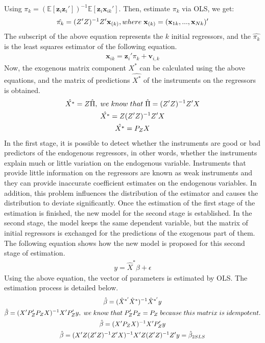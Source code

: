 \documentclass{article}
\newcommand\tab[1][0.5cm]{\hspace*{#1}}
\begin{document}
\newline
Using $\pi_{k} = (\mathbb{E}[\textbf{z}_{i} \textbf{z}_{i}'])^{-1} \mathbb{E}[\textbf{z}_{i} \textbf{x}_{ik}']$. Then, estimate $\pi_{k}$ via OLS, we get:
\begin{gather*}
\hat{\pi_{k}} = (Z'Z)^{-1} Z' \textbf{x}_{(k)}, where\tab[0.1cm] \textbf{x}_{(k)} = (\textbf{x}_{1k},...,\textbf{x}_{Nk})'
\end{gather*} 
The subscript of the above equation represents the $k$ initial regressors, and the $\hat{\pi_{k}}$ is the least squares estimator of the following equation.
\begin{gather*}
\textbf{x}_{ik} = \textbf{z}_{i}'\pi_{k} + \textbf{v}_{i,k}
\end{gather*} 
Now, the exogenous matrix component $X^{*}$ can be calculated using the above equations, and the matrix of predictions $\hat{X^{*}}$ of the instruments on the regressors is obtained. 
\begin{gather*}
\hat{X^{*}} =  Z \hat{\Pi},\tab[0.1cm] we\tab[0.1cm] know\tab[0.1cm] that\tab[0.1cm] \hat{\Pi} = (Z'Z)^{-1} Z'X \\
\hat{X^{*}} = Z(Z'Z)^{-1} Z'X \\
\hat{X^{*}} = P_{Z}X
\end{gather*}
In the first stage, it is possible to detect whether the instruments are good or bad predictors of the endogenous regressors, in other words, whether the instruments explain much or little variation on the endogenous variable. Instruments that provide little information on the regressors are known as weak instruments and they can provide inaccurate coefficient estimates on the endogenous variables. In addition, this problem influences the distribution of the estimator and causes the distribution to deviate significantly.
\newline
Once the estimation of the first stage of the estimation is finished, the new model for the second stage is established. In the second stage, the model keeps the same dependent variable, but the matrix of initial regressors is exchanged for the predictions of the exogenous part of them. The following equation shows how the new model is proposed for this second stage of estimation.
\begin{gather*}
y = \hat X^{*} \beta + \epsilon
\end{gather*}
Using the above equation, the vector of parameters is estimated by OLS. The estimation process is detailed below.
\begin{gather*}
\hat{\beta} = (\hat{X}^{*'} \hat{X}^{*})^{-1} \hat{X}^{*'}y \\
\hat{\beta}= (X'P_{Z}'P_{Z}X)^{-1} X'P_{Z}'y,\tab[0.1cm] we\tab[0.1cm] know\tab[0.1cm] that\tab[0.1cm] P_{Z}'P_{Z} = P_{Z} \tab[0.1cm] because\tab[0.1cm] this\tab[0.1cm] matrix\tab[0.1cm] is\tab[0.1cm] idempotent. \\
\hat{\beta}= (X'P_{Z}X)^{-1} X'P_{Z}'y \\
\hat{\beta}= (X'Z (Z'Z)^{-1}Z'X)^{-1} X'Z(Z'Z)^{-1}Z'y = \hat{\beta}_{2SLS} 
\end{gather*}
\end{document}
